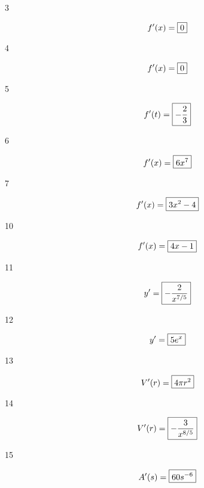 \documentclass[letterpaper]{exam}
\begin{document}
  \begin{description}

    \item[3] 
      \[
        f'(x) = \boxed{ 0 } \\
      \]

    \item[4] 
      \[
        f'(x) = \boxed{ 0 } \\
      \]

    \item[5] 
      \[
        f'(t) = \boxed{ - \frac{2}{3} } \\
      \]

    \item[6] 
      \[
        f'(x) = \boxed{ 6 x^7 } \\
      \]

    \item[7] 
      \[
        f'(x) = \boxed{ 3x^2 - 4 } \\
      \]



    \item[10] 
      \[
        f'(x) = \boxed{ 4x - 1 } \\
      \]

    \item[11] 
      \[
        y' = \boxed{ -\frac{2}{x^{7/5}} } \\
      \]

    \item[12] 
      \[
        y' = \boxed{ 5e^x } \\
      \]

    \item[13] 
      \[
        V'(r) = \boxed{ 4 \pi r^2 } \\
      \]

    \item[14] 
      \[
        V'(r) = \boxed{ -\frac{3}{x^{8/5}} } \\
      \]

    \item[15] 
      \[
        A'(s) = \boxed{ 60 s^{-6} } \\
      \]


\end{description}
\end{document}
